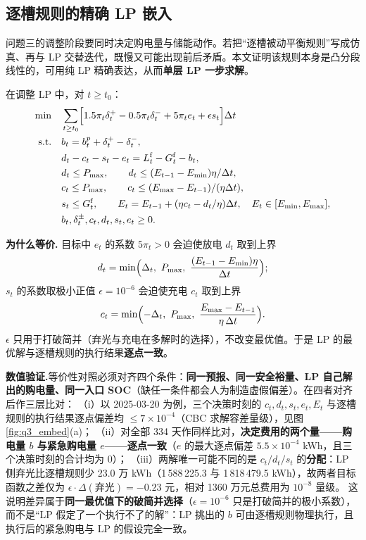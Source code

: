 \documentclass{cumcmthesis}
\begin{document}
\subsection{逐槽规则的精确 LP 嵌入}
问题三的调整阶段要同时决定购电量与储能动作。若把“逐槽被动平衡规则”写成仿真、再与 LP 交替迭代，既慢又可能出现前后矛盾。本文证明该规则本身是凸分段线性的，可用纯 LP 精确表达，从而\textbf{单层 LP 一步求解}。

在调整 LP 中，对 $t\ge t_0$：
\begin{align}
    \min\quad & \sum_{t\ge t_0}\Bigl[1.5\pi_t\delta^{+}_t-0.5\pi_t\delta^{-}_t+5\pi_t e_t+\epsilon s_t\Bigr]\Delta t \\
    \text{s.t.}\quad
    & b_t=b^p_t+\delta^{+}_t-\delta^{-}_t, \nonumber\\
    & d_t-c_t-s_t-e_t=L^{\mathrm f}_t-G^{\mathrm f}_t-b_t, \nonumber\\
    & d_t\le P_{\max},\qquad d_t\le (E_{t-1}-E_{\min})\eta/\Delta t, \nonumber\\
    & c_t\le P_{\max},\qquad c_t\le (E_{\max}-E_{t-1})/(\eta\Delta t), \nonumber\\
    & s_t\le G^{\mathrm f}_t,\qquad E_t=E_{t-1}+(\eta c_t-d_t/\eta)\Delta t,\quad E_t\in[E_{\min},E_{\max}], \nonumber\\
    & b_t,\delta^{\pm}_t,c_t,d_t,s_t,e_t\ge0. \nonumber
\end{align}

\textbf{为什么等价.} 目标中 $e_t$ 的系数 $5\pi_t>0$ 会迫使放电 $d_t$ 取到上界
\[
    d_t=\min\Bigl(\Delta_t,\ P_{\max},\ \frac{(E_{t-1}-E_{\min})\eta}{\Delta t}\Bigr);
\]
$s_t$ 的系数取极小正值 $\epsilon=10^{-6}$ 会迫使充电 $c_t$ 取到上界
\[
    c_t=\min\Bigl(-\Delta_t,\ P_{\max},\ \frac{E_{\max}-E_{t-1}}{\eta\,\Delta t}\Bigr).
\]
$\epsilon$ 只用于打破简并（弃光与充电在多解时的选择），不改变最优值。于是 LP 的最优解与逐槽规则的执行结果\textbf{逐点一致}。

\noindent\textbf{数值验证.}等价性对照必须对齐四个条件：\textbf{同一预报、同一安全裕量、LP 自己解出的购电量、同一入口 SOC}（缺任一条件都会人为制造虚假偏差）。在四者对齐后作三层比对：
（i）以 2025-03-20 为例，三个决策时刻的 $c_t,d_t,s_t,e_t,E_t$ 与逐槽规则的执行结果逐点偏差均 $\le7\times10^{-4}$（CBC 求解容差量级），见图 \ref{fig:q3_embed}(a)；
（ii）对全部 334 天作同样比对，\textbf{决定费用的两个量——购电量 $b$ 与紧急购电量 $e$——逐点一致}（$e$ 的最大逐点偏差 $5.5\times10^{-4}$ kWh，且三个决策时刻的合计均为 0）；
（iii）两解唯一可能不同的是 $c_t/d_t/s_t$ 的\textbf{分配}：LP 侧弃光比逐槽规则少 23.0 万 kWh（1\,588\,225.3 与 1\,818\,479.5 kWh），故两者目标函数之差仅为 $\epsilon\cdot\Delta(\text{弃光})=-0.23$ 元，相对 1360 万元总费用为 $10^{-8}$ 量级。
这说明差异属于\textbf{同一最优值下的破简并选择}（$\epsilon=10^{-6}$ 只是打破简并的极小系数），而不是“LP 假定了一个执行不了的解”：LP 挑出的 $b$ 可由逐槽规则物理执行，且执行后的紧急购电与 LP 的假设完全一致。
\end{document}
